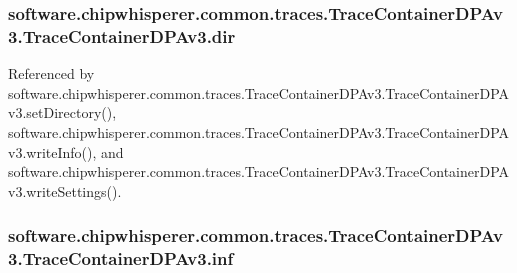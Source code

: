 \subsubsection[{dir}]{\setlength{\rightskip}{0pt plus 5cm}software.\+chipwhisperer.\+common.\+traces.\+Trace\+Container\+D\+P\+Av3.\+Trace\+Container\+D\+P\+Av3.\+dir}\label{classsoftware_1_1chipwhisperer_1_1common_1_1traces_1_1TraceContainerDPAv3_1_1TraceContainerDPAv3_a443f4e12cb19e6f5106de2faebb302b3}


Referenced by software.\+chipwhisperer.\+common.\+traces.\+Trace\+Container\+D\+P\+Av3.\+Trace\+Container\+D\+P\+Av3.\+set\+Directory(), software.\+chipwhisperer.\+common.\+traces.\+Trace\+Container\+D\+P\+Av3.\+Trace\+Container\+D\+P\+Av3.\+write\+Info(), and software.\+chipwhisperer.\+common.\+traces.\+Trace\+Container\+D\+P\+Av3.\+Trace\+Container\+D\+P\+Av3.\+write\+Settings().

\hypertarget{classsoftware_1_1chipwhisperer_1_1common_1_1traces_1_1TraceContainerDPAv3_1_1TraceContainerDPAv3_af06bd9d11fd05dcbb4c172cd1215407c}{}
\subsubsection[{inf}]{\setlength{\rightskip}{0pt plus 5cm}software.\+chipwhisperer.\+common.\+traces.\+Trace\+Container\+D\+P\+Av3.\+Trace\+Container\+D\+P\+Av3.\+inf}\label{classsoftware_1_1chipwhisperer_1_1common_1_1traces_1_1TraceContainerDPAv3_1_1TraceContainerDPAv3_af06bd9d11fd05dcbb4c172cd1215407c}
\hypertarget{classsoftware_1_1chipwhisperer_1_1common_1_1traces_1_1TraceContainerDPAv3_1_1TraceContainerDPAv3_a5c3961aaaba581560ff10ba1177a97b3}{}
